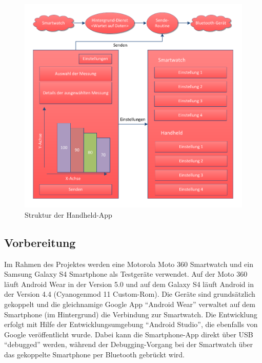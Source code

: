 \bigskip
\begin{figure}[H]
	\centering
	\includegraphics[scale=0.65]{images/strucure_handheld.pdf}
	\caption{Struktur der Handheld-App}
	\label{fig:strucure_handheld}
\end{figure}
\bigskip

\subsection{Vorbereitung}
Im Rahmen des Projektes werden eine Motorola Moto 360 Smartwatch und ein Samsung Galaxy S4 Smartphone als Testgeräte verwendet. Auf der Moto 360 läuft Android Wear in der Version 5.0 und auf dem Galaxy S4 läuft Android in der Version 4.4 (Cyanogenmod 11 Custom-Rom). Die Geräte sind grundsätzlich gekoppelt und die gleichnamige Google App "`Android Wear"' verwaltet auf dem Smartphone (im Hintergrund) die Verbindung zur Smartwatch. Die Entwicklung erfolgt mit Hilfe der Entwicklungsumgebung "`Android Studio"', die ebenfalls von Google veröffentlicht wurde. Dabei kann die Smartphone-App direkt über USB "`debugged"' werden, während der Debugging-Vorgang bei der Smartwatch über das gekoppelte Smartphone per Bluetooth gebrückt wird.

